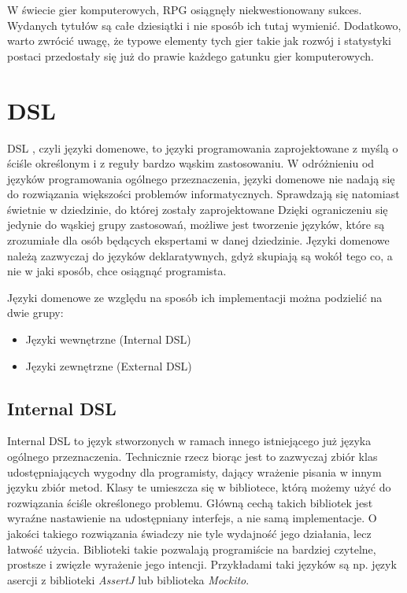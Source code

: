 \documentclass[openright]{xmgr}
\begin{document}
W świecie gier komputerowych, RPG osiągnęły niekwestionowany sukces. Wydanych tytułów są całe dziesiątki i nie sposób ich tutaj wymienić. Dodatkowo, warto zwrócić uwagę, że typowe elementy tych gier takie jak rozwój i statystyki postaci przedostały się już do prawie każdego gatunku gier komputerowych.

\section{DSL}

DSL \cite{DSL:2017}, czyli języki domenowe, to języki programowania zaprojektowane z myślą o ściśle określonym i z reguły bardzo wąskim zastosowaniu. W odróżnieniu od języków programowania ogólnego przeznaczenia, języki domenowe nie nadają się do rozwiązania większości problemów informatycznych. Sprawdzają się natomiast świetnie w dziedzinie, do której zostały zaprojektowane Dzięki ograniczeniu się jedynie do wąskiej grupy zastosowań, możliwe jest tworzenie języków, które są zrozumiałe dla osób będących ekspertami w danej dziedzinie. Języki domenowe należą zazwyczaj do języków deklaratywnych, gdyż skupiają są wokół tego co, a nie w jaki sposób, chce osiągnąć programista.

Języki domenowe ze względu na sposób ich implementacji można podzielić na dwie grupy:
\begin{itemize}
\item Języki wewnętrzne (Internal DSL)
\item Języki zewnętrzne (External DSL)
\end{itemize}

\subsection{Internal DSL}

Internal DSL to język stworzonych w ramach innego istniejącego już języka ogólnego przeznaczenia. Technicznie rzecz biorąc jest to zazwyczaj zbiór klas udostępniających wygodny dla programisty, dający wrażenie pisania w innym języku zbiór metod. Klasy te umieszcza się w bibliotece, którą możemy użyć do rozwiązania ściśle określonego problemu. Główną cechą takich bibliotek jest wyraźne nastawienie na udostępniany interfejs, a nie samą implementacje. O jakości takiego rozwiązania świadczy nie tyle wydajność jego działania, lecz łatwość użycia. Biblioteki takie pozwalają programiście na bardziej czytelne, prostsze i zwięzłe wyrażenie jego intencji. Przykładami taki języków są np. język asercji z biblioteki \textit{AssertJ} lub  biblioteka \textit{Mockito}. 
\end{document}
